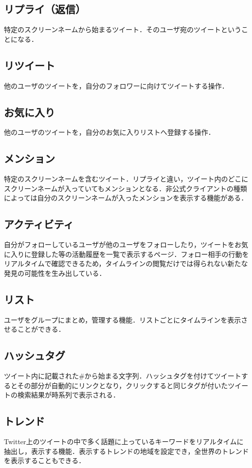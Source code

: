 \subsection{リプライ（返信）}
特定のスクリーンネームから始まるツイート．そのユーザ宛のツイートということになる．

\subsection{リツイート}
他のユーザのツイートを，自分のフォロワーに向けてツイートする操作．

\subsection{お気に入り}
他のユーザのツイートを，自分のお気に入りリストへ登録する操作．

\subsection{メンション}
特定のスクリーンネームを含むツイート．リプライと違い，ツイート内のどこにスクリーンネームが入っていてもメンションとなる．非公式クライアントの種類によっては自分のスクリーンネームが入ったメンションを表示する機能がある．

\subsection{アクティビティ}
自分がフォローしているユーザが他のユーザをフォローしたり，ツイートをお気に入りに登録した等の活動履歴を一覧で表示するページ．フォロー相手の行動をリアルタイムで確認できるため，タイムラインの閲覧だけでは得られない新たな発見の可能性を生み出している．

\subsection{リスト}
ユーザをグループにまとめ，管理する機能．リストごとにタイムラインを表示させることができる．

\subsection{ハッシュタグ}
ツイート内に記載された\#から始まる文字列．ハッシュタグを付けてツイートするとその部分が自動的にリンクとなり，クリックすると同じタグが付いたツイートの検索結果が時系列で表示される．

\subsection{トレンド}
Twitter上のツイートの中で多く話題に上っているキーワードをリアルタイムに抽出し，表示する機能．表示するトレンドの地域を設定でき，全世界のトレンドを表示することもできる．

